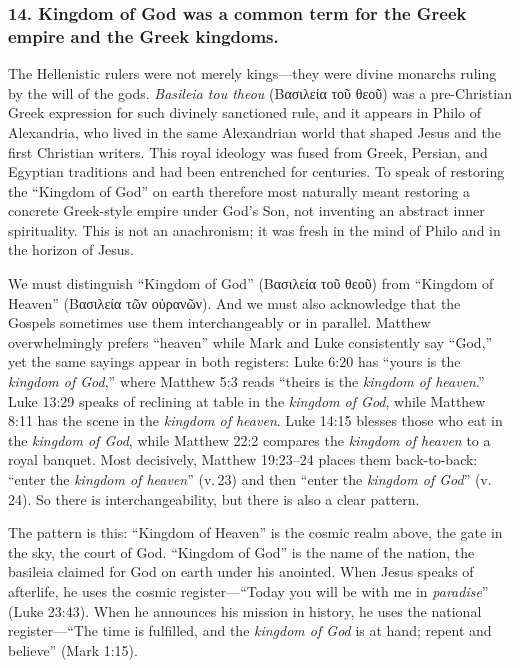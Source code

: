 \subsubsection{14.
Kingdom of God was a common term for the Greek empire and the Greek kingdoms.}\label{subsubsec:kingdom-of-god-was-a-common-term-for-the-greek-empire-and-the-greek-kingdoms.}

The Hellenistic rulers were not merely kings---they were divine monarchs ruling by the will of the gods.
\emph{Basileia tou theou} (Βασιλεία τοῦ θεοῦ) was a pre-Christian Greek expression for such divinely sanctioned rule, and it appears in Philo of Alexandria, who lived in the same Alexandrian world that shaped Jesus and the first Christian writers.
This royal ideology was fused from Greek, Persian, and Egyptian traditions and had been entrenched for centuries.
To speak of restoring the ``Kingdom of God'' on earth therefore most naturally meant restoring a concrete Greek-style empire under God’s Son, not inventing an abstract inner spirituality.
This is not an anachronism; it was fresh in the mind of Philo and in the horizon of Jesus.

We must distinguish ``Kingdom of God'' (Βασιλεία τοῦ θεοῦ) from ``Kingdom of Heaven'' (Βασιλεία τῶν οὐρανῶν).
And we must also acknowledge that the Gospels sometimes use them interchangeably or in parallel.
Matthew overwhelmingly prefers ``heaven'' while Mark and Luke consistently say ``God,'' yet the same sayings appear in both registers:
Luke 6:20 has ``yours is the \emph{kingdom of God},'' where Matthew 5:3 reads ``theirs is the \emph{kingdom of heaven}.''
Luke 13:29 speaks of reclining at table in the \emph{kingdom of God}, while Matthew 8:11 has the scene in the \emph{kingdom of heaven}.
Luke 14:15 blesses those who eat in the \emph{kingdom of God}, while Matthew 22:2 compares the \emph{kingdom of heaven} to a royal banquet.
Most decisively, Matthew 19:23--24 places them back-to-back: ``enter the \emph{kingdom of heaven}'' (v.\,23) and then ``enter the \emph{kingdom of God}'' (v.\,24).
So there is interchangeability, but there is also a clear pattern.

The pattern is this: ``Kingdom of Heaven'' is the cosmic realm above, the gate in the sky, the court of God.
``Kingdom of God'' is the name of the nation, the basileia claimed for God on earth under his anointed.
When Jesus speaks of afterlife, he uses the cosmic register---``Today you will be with me in \emph{paradise}'' (Luke 23:43).
When he announces his mission in history, he uses the national register---``The time is fulfilled, and the \emph{kingdom of God} is at hand; repent and believe'' (Mark 1:15).

